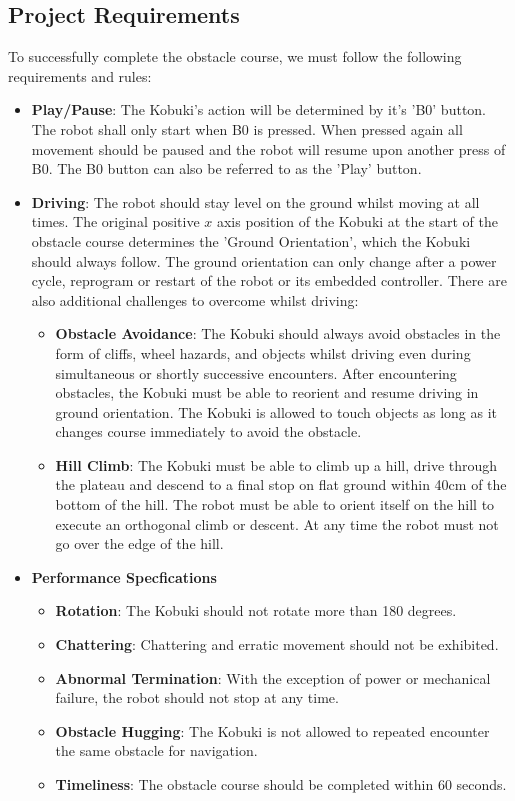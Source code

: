 \documentclass[11pt]{article}
\begin{document}
\subsection{Project Requirements}
To successfully complete the obstacle course, we must follow the following requirements and rules:
\begin{itemize}
    \item \textbf{Play/Pause}: 
    The Kobuki's action will be determined by it's 'B0' button. The robot shall only start when B0 is pressed. When pressed again all movement should be paused and the robot will resume upon another press of B0. The B0 button can also be referred to as the 'Play' button.
    \item \textbf{Driving}:
    The robot should stay level on the ground whilst moving at all times. The original positive $x$ axis position of the Kobuki at the start of the obstacle course determines the 'Ground Orientation', which the Kobuki should always follow. The ground orientation can only change after a power cycle, reprogram or restart of the robot or its embedded controller. There are also additional challenges to overcome whilst driving:
    \begin{itemize}
        \item \textbf{Obstacle Avoidance}:
        The Kobuki should always avoid obstacles in the form of cliffs, wheel hazards, and objects whilst driving even during simultaneous or shortly successive encounters. After encountering obstacles, the Kobuki must be able to reorient and resume driving in ground orientation. The Kobuki is allowed to touch objects as long as it changes course immediately to avoid the obstacle. 
        \item \textbf{Hill Climb}:
        The Kobuki must be able to climb up a hill, drive through the plateau and descend to a final stop on flat ground within 40cm of the bottom of the hill. The robot must be able to orient itself on the hill to execute an orthogonal climb or descent. At any time the robot must not go over the edge of the hill.
    \end{itemize}
    \item \textbf{Performance Specfications}
    \begin{itemize}
        \item \textbf{Rotation}: The Kobuki should not rotate more than 180 degrees.
        \item \textbf{Chattering}: Chattering and erratic movement should not be exhibited.
        \item \textbf{Abnormal Termination}: With the exception of power or mechanical failure, the robot should not stop at any time.
        \item \textbf{Obstacle Hugging}: The Kobuki is not allowed to repeated encounter the same obstacle for navigation.
        \item \textbf{Timeliness}: The obstacle course should be completed within 60 seconds.
    \end{itemize}
\end{itemize}
\end{document}
